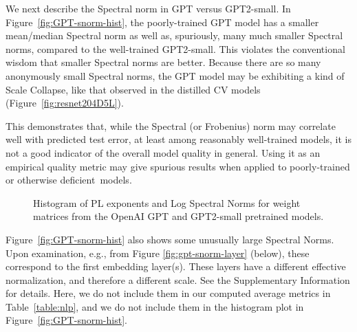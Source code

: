 We next describe the Spectral norm in GPT versus GPT2-small.
In Figure~\ref{fig:GPT-snorm-hist}, the poorly-trained GPT model has a smaller mean/median Spectral norm as well as, spuriously, many much smaller Spectral norms, compared to the well-trained GPT2-small.
This violates the conventional wisdom that smaller Spectral norms are better.
Because there are so many anonymously small Spectral norms, the GPT model may be exhibiting a kind of Scale Collapse, like that observed in the distilled CV models (Figure~\ref{fig:resnet204D5L}).

This demonstrates that, while the Spectral (or Frobenius) norm may correlate well with predicted test error, at least among reasonably well-trained models, it is not a good indicator of the overall model quality in general.
Using it as an empirical quality metric may give spurious results when applied to poorly-trained or otherwise deficient~models. 

\begin{figure}[h]
    \centering
    \qquad
   \caption{Histogram of PL exponents 
           and Log Spectral Norms 
           for weight matrices from the OpenAI GPT and GPT2-small pretrained models.}
   
\label{fig:GPT-hist}
\end{figure}


Figure~\ref{fig:GPT-snorm-hist} also shows some unusually large Spectral Norms.
Upon examination, e.g., from Figure \ref{fig:gpt-snorm-layer} (below), these correspond to the first embedding layer(s).
These layers have a different effective normalization, and therefore a different scale.
See the Supplementary Information
for details.
Here, we do not include them in our computed average metrics in Table~\ref{table:nlp}, and we do not include them in the histogram plot in Figure~\ref{fig:GPT-snorm-hist}.



